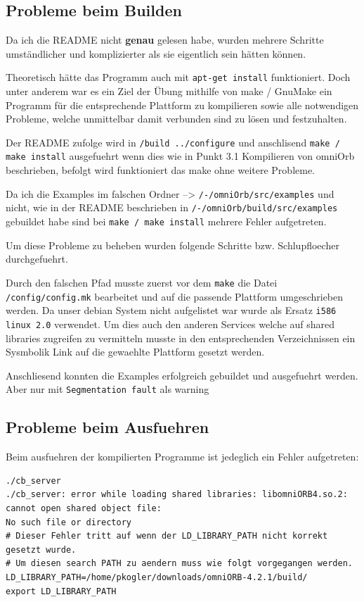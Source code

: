 \clearpage
\subsection{Probleme beim Builden}
Da ich die README nicht \textbf{genau} gelesen habe, wurden mehrere Schritte umständlicher und komplizierter als sie eigentlich sein hätten können.

Theoretisch hätte das Programm auch mit \texttt{apt-get install} funktioniert. Doch unter anderem war es ein Ziel der Übung mithilfe von make / GnuMake ein Programm für die entsprechende Plattform zu kompilieren sowie alle notwendigen Probleme, welche unmittelbar damit verbunden sind zu lösen und festzuhalten.

Der README zufolge wird in \texttt{/build ../configure} und anschlisend \texttt{make / make install} ausgefuehrt wenn dies wie in Punkt 3.1 Kompilieren von omniOrb beschrieben, befolgt wird funktioniert das make ohne weitere Probleme.

Da ich die Examples im falschen Ordner --> \texttt{/-/omniOrb/src/examples} und nicht, wie in der README beschrieben in \texttt{/-/omniOrb/build/src/examples} gebuildet habe sind bei \texttt{make / make install} mehrere Fehler aufgetreten.

Um diese Probleme zu beheben wurden folgende Schritte bzw. Schlupfloecher durchgefuehrt.

Durch den falschen Pfad musste zuerst vor dem \texttt{make} die Datei \texttt{/config/config.mk} bearbeitet und auf die passende Plattform umgeschrieben werden. Da unser debian System nicht aufgelistet war wurde als Ersatz \texttt{i586 linux 2.0} verwendet. Um dies auch den anderen Services welche auf shared libraries zugreifen zu vermitteln musste in den entsprechenden Verzeichnissen ein Sysmbolik Link auf die gewaehlte Plattform gesetzt werden.

Anschliesend konnten die Examples erfolgreich gebuildet und ausgefuehrt werden. Aber nur mit \texttt{Segmentation fault} als warning

\subsection{Probleme beim Ausfuehren}
Beim ausfuehren der kompilierten Programme ist jedeglich ein Fehler aufgetreten:
\begin{lstlisting}[style=BashInputStyle, caption=Problem beim Ausfuehren]
./cb_server
./cb_server: error while loading shared libraries: libomniORB4.so.2: cannot open shared object file: 
No such file or directory
# Dieser Fehler tritt auf wenn der LD_LIBRARY_PATH nicht korrekt gesetzt wurde.
# Um diesen search PATH zu aendern muss wie folgt vorgegangen werden.
LD_LIBRARY_PATH=/home/pkogler/downloads/omniORB-4.2.1/build/
export LD_LIBRARY_PATH
\end{lstlisting}

